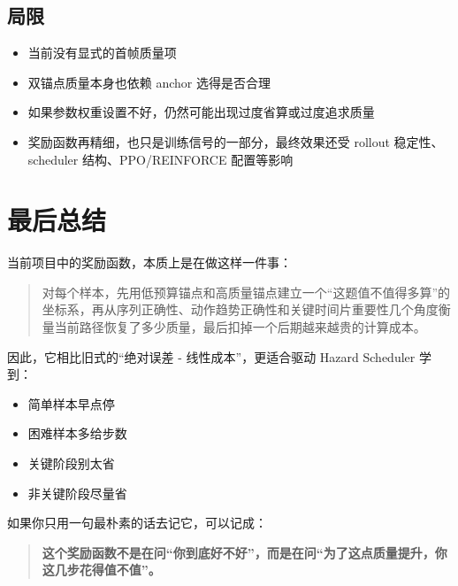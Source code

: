 \documentclass[12pt]{ctexart}
\begin{document}
\subsection{局限}

\begin{itemize}
    \item 当前没有显式的首帧质量项
    \item 双锚点质量本身也依赖 anchor 选得是否合理
    \item 如果参数权重设置不好，仍然可能出现过度省算或过度追求质量
    \item 奖励函数再精细，也只是训练信号的一部分，最终效果还受 rollout 稳定性、scheduler 结构、PPO/REINFORCE 配置等影响
\end{itemize}

\section{最后总结}

当前项目中的奖励函数，本质上是在做这样一件事：

\begin{quote}
    对每个样本，先用低预算锚点和高质量锚点建立一个“这题值不值得多算”的坐标系，再从序列正确性、动作趋势正确性和关键时间片重要性几个角度衡量当前路径恢复了多少质量，最后扣掉一个后期越来越贵的计算成本。
\end{quote}

因此，它相比旧式的“绝对误差 - 线性成本”，更适合驱动 Hazard Scheduler 学到：

\begin{itemize}
    \item 简单样本早点停
    \item 困难样本多给步数
    \item 关键阶段别太省
    \item 非关键阶段尽量省
\end{itemize}

如果你只用一句最朴素的话去记它，可以记成：

\begin{quote}
    \textbf{这个奖励函数不是在问“你到底好不好”，而是在问“为了这点质量提升，你这几步花得值不值”。}
\end{quote}
\end{document}
